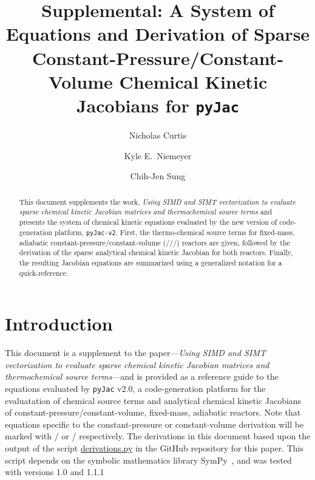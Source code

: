 \documentclass[12pt,number,sort&compress]{elsarticle}
\title{Supplemental: A System of Equations and Derivation of Sparse Constant-Pressure\slash Constant-Volume Chemical Kinetic Jacobians for \texttt{pyJac}}
\author[1]{Nicholas Curtis\corref{corr}}
\author[2]{Kyle E.~Niemeyer}
\author[1]{Chih-Jen Sung}
\begin{document}
\begin{frontmatter}

\begin{abstract} %
This document supplements the work, \textit{Using SIMD and SIMT vectorization to evaluate sparse chemical kinetic Jacobian matrices and thermochemical source terms} and presents the system of chemical kinetic equations evaluated by the new version of code-generation platform, \texttt{pyJac-v2}.
First, the thermo-chemical source terms for fixed-mass, adiabatic constant-pressure\slash constant-volume (\conp/\slash\conv/) reactors are given, followed by the derivation of the sparse analytical chemical kinetic Jacobian for both reactors.
Finally, the resulting Jacobian equations are summarized using a generalized notation for a quick-reference.
\end{abstract}


\end{frontmatter}

\section{Introduction}
This document is a supplement to the paper---\textit{Using SIMD and SIMT vectorization to evaluate sparse chemical kinetic Jacobian matrices and thermochemical source terms}---and is provided as a reference guide to the equations evaluated by \texttt{pyJac} v2.0, a code-generation platform for the evaluatation of chemical source terms and analytical chemical kinetic Jacobians of constant-pressure\slash constant-volume, fixed-mass, adiabatic reactors.
Note that equations specific to the constant-pressure or constant-volume derivation will be marked with \conp/ or \conv/ respectively.
The derivations in this document based upon the output of the script \href{https://github.com/arghdos/SPyJac-paper/blob/master/derivations/scripts/derivations.py}{derivations.py} in the GitHub repository for this paper.
This script depends on the symbolic mathematics library SymPy~\cite{sympy}, and was tested with versions 1.0 and 1.1.1
\end{document}
